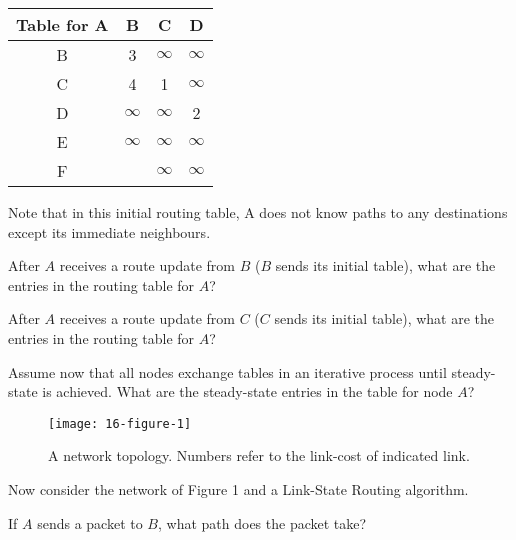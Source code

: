 \documentclass{supervision}
\begin{document}
\begin{questions}
\begin{parts}
            \begin{table}[h]
              \centering
              \begin{tabular}{|c|ccc|}
                \hline
                Table for A & B        & C        & D        \\ \hline
                B           & 3        & $\infty$ & $\infty$ \\
                C           & 4        & 1        & $\infty$ \\
                D           & $\infty$ & $\infty$ & 2        \\
                E           & $\infty$ & $\infty$ & $\infty$ \\
                F           &          & $\infty$ & $\infty$ \\ \hline
              \end{tabular}
            \end{table}

            Note that in this initial routing table, A does not know paths
            to any destinations except its immediate neighbours.

            \begin{subparts}
              \subpart After $A$ receives a route update from $B$ ($B$ sends
                its initial table), what are the entries in the routing table
                for $A$?

              \subpart After $A$ receives a route update from $C$ ($C$ sends
                its initial table), what are the entries in the routing table
                for $A$?

              \subpart Assume now that all nodes exchange tables in an
                iterative process until steady-state is achieved. What are the
                steady-state entries in the table for node $A$?
            \end{subparts}

            \begin{figure}[h!]
              \caption{A network topology. Numbers refer to the link-cost of
                indicated link.}
              \centering
                \texttt{[image: 16-figure-1]}
            \end{figure}

            Now consider the network of Figure 1 and a Link-State Routing
            algorithm.

            \begin{subparts}
              \subpart If $A$ sends a packet to $B$, what path does the packet
                take?


\end{subparts}
\end{parts}
\end{questions}
\end{document}
